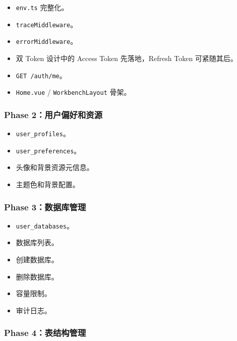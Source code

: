 \documentclass[
  a4paper,
  UTF8]{ctexart}
\providecommand{\tightlist}{%
  \setlength{\itemsep}{0pt}\setlength{\parskip}{0pt}}
\begin{document}
\begin{itemize}
\tightlist
\item
  \texttt{env.ts} 完整化。
\item
  \texttt{traceMiddleware}。
\item
  \texttt{errorMiddleware}。
\item
  双 Token 设计中的 Access Token 先落地，Refresh Token 可紧随其后。
\item
  \texttt{GET\ /auth/me}。
\item
  \texttt{Home.vue} / \texttt{WorkbenchLayout} 骨架。
\end{itemize}

\hypertarget{phase-2ux7528ux6237ux504fux597dux548cux8d44ux6e90}{%
\subsubsection{Phase
2：用户偏好和资源}\label{phase-2ux7528ux6237ux504fux597dux548cux8d44ux6e90}}

\begin{itemize}
\tightlist
\item
  \texttt{user\_profiles}。
\item
  \texttt{user\_preferences}。
\item
  头像和背景资源元信息。
\item
  主题色和背景配置。
\end{itemize}

\hypertarget{phase-3ux6570ux636eux5e93ux7ba1ux7406}{%
\subsubsection{Phase
3：数据库管理}\label{phase-3ux6570ux636eux5e93ux7ba1ux7406}}

\begin{itemize}
\tightlist
\item
  \texttt{user\_databases}。
\item
  数据库列表。
\item
  创建数据库。
\item
  删除数据库。
\item
  容量限制。
\item
  审计日志。
\end{itemize}

\hypertarget{phase-4ux8868ux7ed3ux6784ux7ba1ux7406}{%
\subsubsection{Phase
4：表结构管理}\label{phase-4ux8868ux7ed3ux6784ux7ba1ux7406}}
\end{document}
